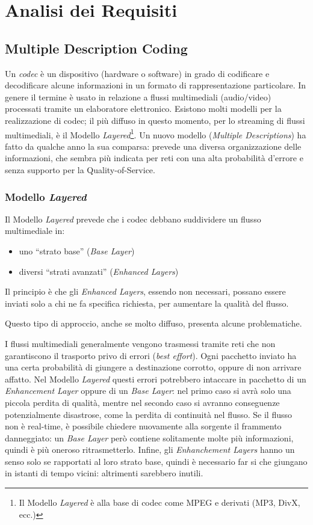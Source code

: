 \chapter{Analisi dei Requisiti}
\label{cap:analisi_requisiti}




\section{Multiple Description Coding}


Un \emph{codec} è un dispositivo (hardware o software) in grado di codificare e
decodificare alcune informazioni in un formato di rappresentazione particolare.
In genere il termine è usato in relazione a flussi multimediali (audio/video)
processati tramite un elaboratore elettronico. Esistono molti modelli per la
realizzazione di codec; il più diffuso in questo momento, per lo streaming di
flussi multimediali, è il Modello \emph{Layered}\footnote{Il Modello
\emph{Layered} è alla base di codec come MPEG e derivati (MP3, DivX, ecc.)}. Un
nuovo modello (\emph{Multiple Descriptions}) ha fatto da qualche anno la sua
comparsa: prevede una diversa organizzazione delle informazioni, che sembra più
indicata per reti con una alta probabilità d'errore e senza supporto per la
Quality-of-Service.


\subsection{Modello \emph{Layered}}
Il Modello \emph{Layered} prevede che i codec debbano suddividere un flusso
multimediale in:
\begin{itemize}
  \item uno ``strato base'' (\emph{Base Layer})
  \item diversi ``strati avanzati'' (\emph{Enhanced Layers}) 
\end{itemize}

Il principio è che gli \emph{Enhanced Layers}, essendo non necessari, possano
essere inviati solo a chi ne fa specifica richiesta, per aumentare la
qualità del flusso.

Questo tipo di approccio, anche se molto diffuso,
presenta alcune problematiche.

I flussi multimediali generalmente vengono trasmessi tramite reti che non
garantiscono il trasporto privo di errori (\emph{best effort}). Ogni pacchetto
inviato ha una certa probabilità di giungere a destinazione corrotto, oppure di
non arrivare affatto. Nel Modello \emph{Layered} questi errori potrebbero
intaccare in pacchetto di un \emph{Enhancement Layer} oppure di un \emph{Base
Layer}: nel primo caso si avrà solo una piccola perdita di qualità, mentre nel
secondo caso si avranno conseguenze potenzialmente disastrose, come la perdita
di continuità nel flusso. Se il flusso non è real-time, è possibile chiedere
nuovamente alla sorgente il frammento danneggiato: un \emph{Base Layer} però
contiene solitamente molte più informazioni, quindi è più oneroso
ritrasmetterlo.
Infine, gli \emph{Enhanchement Layers} hanno un senso solo se rapportati al
loro strato base, quindi è necessario far si che giungano in istanti di
tempo vicini: altrimenti sarebbero inutili.


